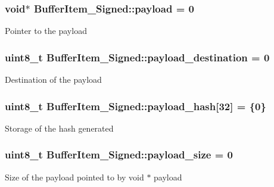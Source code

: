 \subsubsection[{\texorpdfstring{payload}{payload}}]{\setlength{\rightskip}{0pt plus 5cm}void$\ast$ Buffer\+Item\+\_\+\+Signed\+::payload = 0}\hypertarget{structBufferItem__Signed_a4f268b032fb161b2c73daad2d2659291}{}\label{structBufferItem__Signed_a4f268b032fb161b2c73daad2d2659291}
Pointer to the payload 
\subsubsection[{\texorpdfstring{payload\+\_\+destination}{payload_destination}}]{\setlength{\rightskip}{0pt plus 5cm}uint8\+\_\+t Buffer\+Item\+\_\+\+Signed\+::payload\+\_\+destination = 0}\hypertarget{structBufferItem__Signed_ad71dae240fb681bedb0c0332fff403fe}{}\label{structBufferItem__Signed_ad71dae240fb681bedb0c0332fff403fe}
Destination of the payload 
\subsubsection[{\texorpdfstring{payload\+\_\+hash}{payload_hash}}]{\setlength{\rightskip}{0pt plus 5cm}uint8\+\_\+t Buffer\+Item\+\_\+\+Signed\+::payload\+\_\+hash\mbox{[}32\mbox{]} = \{0\}}\hypertarget{structBufferItem__Signed_aea55c4b9fa78da421de8f83df370fb57}{}\label{structBufferItem__Signed_aea55c4b9fa78da421de8f83df370fb57}
Storage of the hash generated 
\subsubsection[{\texorpdfstring{payload\+\_\+size}{payload_size}}]{\setlength{\rightskip}{0pt plus 5cm}uint8\+\_\+t Buffer\+Item\+\_\+\+Signed\+::payload\+\_\+size = 0}\hypertarget{structBufferItem__Signed_a99af0ec40a5d44a11df8592667fe7614}{}\label{structBufferItem__Signed_a99af0ec40a5d44a11df8592667fe7614}
Size of the payload pointed to by void $\ast$ payload 
